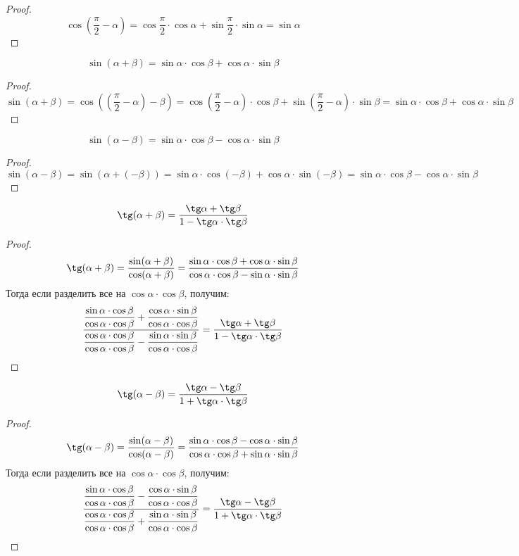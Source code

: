 \documentclass[12pt]{article}
\begin{document}
    \begin{proof}
        $$\cos\left(\dfrac{\pi}{2}-\alpha\right)=\cos\dfrac{\pi}{2}\cdot\cos\alpha+\sin\dfrac{\pi}{2}\cdot\sin\alpha=\sin\alpha$$
    \end{proof}
    \begin{statement}
        $$\sin(\alpha+\beta)=\sin\alpha\cdot\cos\beta+\cos\alpha\cdot\sin\beta$$
    \end{statement}
    \begin{proof}
        $$\sin(\alpha+\beta)=\cos\left(\left(\dfrac{\pi}{2}-\alpha\right)-\beta\right)=\cos\left(\dfrac{\pi}{2}-\alpha\right)\cdot \cos \beta+\sin\left(\dfrac{\pi}{2}-\alpha\right)\cdot \sin \beta=\sin\alpha\cdot\cos\beta+\cos\alpha\cdot\sin\beta$$
    \end{proof}
    \begin{statement}
        $$\sin(\alpha-\beta)=\sin\alpha\cdot\cos\beta-\cos\alpha\cdot\sin\beta$$
    \end{statement}
    \begin{proof}
        $$\sin(\alpha-\beta)=\sin(\alpha+(-\beta))=\sin\alpha\cdot\cos(-\beta)+\cos\alpha\cdot\sin(-\beta)=\sin\alpha\cdot\cos\beta-\cos\alpha\cdot\sin\beta$$
    \end{proof}
    \begin{statement}
        $$\tg(\alpha+\beta)=\dfrac{\tg\alpha+\tg\beta}{1-\tg\alpha\cdot\tg\beta}$$
    \end{statement}
    \begin{proof}
        $$\tg(\alpha+\beta)=\dfrac{\sin(\alpha+\beta)}{\cos(\alpha+\beta)}=\dfrac{\sin\alpha\cdot\cos\beta+\cos\alpha\cdot\sin\beta}{\cos\alpha\cdot\cos\beta-\sin\alpha\cdot\sin\beta}$$
        Тогда если разделить все на $\cos\alpha\cdot\cos\beta$, получим:
        $$\dfrac{\dfrac{\sin\alpha\cdot\cos\beta}{\cos\alpha\cdot\cos\beta}+\dfrac{\cos\alpha\cdot\sin\beta}{\cos\alpha\cdot\cos\beta}}{\dfrac{\cos\alpha\cdot\cos\beta}{\cos\alpha\cdot\cos\beta}-\dfrac{\sin\alpha\cdot\sin\beta}{\cos\alpha\cdot\cos\beta}}=\dfrac{\tg\alpha+\tg\beta}{1-\tg\alpha\cdot\tg\beta}$$
    \end{proof}
    \begin{statement}
        $$\tg(\alpha-\beta)=\dfrac{\tg\alpha-\tg\beta}{1+\tg\alpha\cdot\tg\beta}$$
    \end{statement}
    \begin{proof}
        $$\tg(\alpha-\beta)=\dfrac{\sin(\alpha-\beta)}{\cos(\alpha-\beta)}=\dfrac{\sin\alpha\cdot\cos\beta-\cos\alpha\cdot\sin\beta}{\cos\alpha\cdot\cos\beta+\sin\alpha\cdot\sin\beta}$$
        Тогда если разделить все на $\cos\alpha\cdot\cos\beta$, получим:
        $$\dfrac{\dfrac{\sin\alpha\cdot\cos\beta}{\cos\alpha\cdot\cos\beta}-\dfrac{\cos\alpha\cdot\sin\beta}{\cos\alpha\cdot\cos\beta}}{\dfrac{\cos\alpha\cdot\cos\beta}{\cos\alpha\cdot\cos\beta}+\dfrac{\sin\alpha\cdot\sin\beta}{\cos\alpha\cdot\cos\beta}}=\dfrac{\tg\alpha-\tg\beta}{1+\tg\alpha\cdot\tg\beta}$$
    \end{proof}
\end{document}
